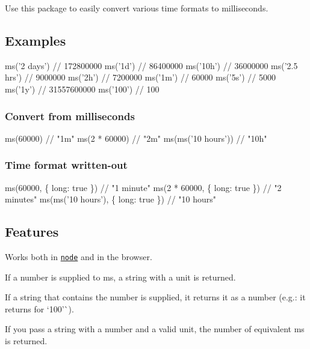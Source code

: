 \href{https://travis-ci.org/zeit/ms}{\tt } \href{https://github.com/sindresorhus/xo}{\tt } \href{https://zeit.chat/}{\tt }

Use this package to easily convert various time formats to milliseconds.

\subsection*{Examples}


\begin{DoxyCode}
ms('2 days')  // 172800000
ms('1d')      // 86400000
ms('10h')     // 36000000
ms('2.5 hrs') // 9000000
ms('2h')      // 7200000
ms('1m')      // 60000
ms('5s')      // 5000
ms('1y')      // 31557600000
ms('100')     // 100
\end{DoxyCode}


\subsubsection*{Convert from milliseconds}


\begin{DoxyCode}
ms(60000)             // "1m"
ms(2 * 60000)         // "2m"
ms(ms('10 hours'))    // "10h"
\end{DoxyCode}


\subsubsection*{Time format written-\/out}


\begin{DoxyCode}
ms(60000, \{ long: true \})             // "1 minute"
ms(2 * 60000, \{ long: true \})         // "2 minutes"
ms(ms('10 hours'), \{ long: true \})    // "10 hours"
\end{DoxyCode}


\subsection*{Features}


\begin{DoxyItemize}
\item Works both in \href{https://nodejs.org}{\tt node} and in the browser.
\item If a number is supplied to {\ttfamily ms}, a string with a unit is returned.
\item If a string that contains the number is supplied, it returns it as a number (e.\+g.\+: it returns {} for `\textquotesingle{}100'\`{}).
\item If you pass a string with a number and a valid unit, the number of equivalent ms is returned.
\end{DoxyItemize}

